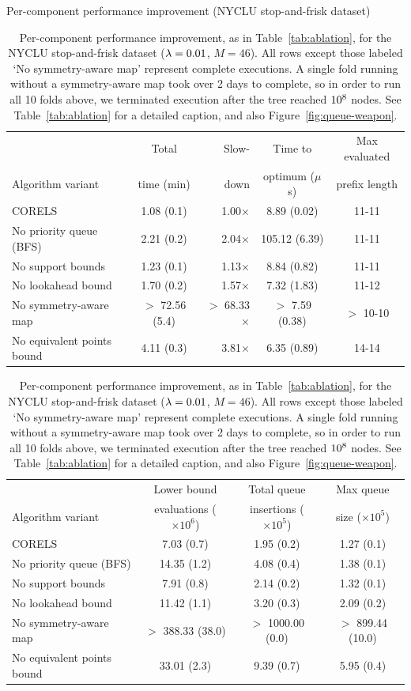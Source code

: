 \begin{table}[t!]
\centering
Per-component performance improvement (NYCLU stop-and-frisk dataset) \\
\vspace{1mm}
\begin{tabular}{l | c  r | c | c}
& Total & Slow- & Time to & Max evaluated \\
Algorithm variant & time (min) & down & optimum ($\mu$s) & prefix length \\
\hline
CORELS & 1.08 (0.1) & 1.00$\times$ & 8.89 (0.02) & 11-11 \\
No priority queue (BFS) & 2.21 (0.2) & 2.04$\times$ & 105.12 (6.39) & 11-11 \\
No support bounds & 1.23 (0.1) & 1.13$\times$ & 8.84 (0.82) & 11-11 \\
No lookahead bound & 1.70 (0.2) & 1.57$\times$ & 7.32 (1.83) & 11-12 \\
No symmetry-aware map & $>$ 72.56 (5.4) & $>$ 68.33$\times$ & $>$ 7.59 (0.38) & $>$ 10-10 \\
No equivalent points bound & 4.11 (0.3) & 3.81$\times$ & 6.35 (0.89) & 14-14 \\
\hline
\end{tabular}
\begin{tabular}{l | c | c | c}
\hline
 & Lower bound & Total queue &  Max queue \\
Algorithm variant & evaluations ($\times 10^6$) & insertions ($\times 10^5$) & size ($\times 10^5$) \\
\hline
CORELS & 7.03 (0.7) & 1.95 (0.2) & 1.27 (0.1) \\
No priority queue (BFS) & 14.35 (1.2) & 4.08 (0.4) & 1.38 (0.1) \\
No support bounds & 7.91 (0.8) & 2.14 (0.2) & 1.32 (0.1) \\
No lookahead bound & 11.42 (1.1) & 3.20 (0.3) & 2.09 (0.2) \\
No symmetry-aware map & $>$ 388.33 (38.0) & $>$ 1000.00 (0.0) & $>$ 899.44 (10.0) \\
No equivalent points bound & 33.01 (2.3) & 9.39 (0.7) & 5.95 (0.4) \\
\end{tabular}
\caption{Per-component performance improvement, as in Table~\ref{tab:ablation},
for the NYCLU stop-and-frisk dataset (${{\lambda} = 0.01}$, ${M = 46}$).
%
All rows except those labeled `No symmetry-aware map' represent complete executions.
%
A single fold running without a symmetry-aware map took over 2 days to complete, so in order to run all 10 folds above, we terminated execution after the tree reached $10 \time 10^8$ nodes.
%
See Table~\ref{tab:ablation} for a detailed caption,
and also Figure~\ref{fig:queue-weapon}.
}
\vspace{4mm}
\label{tab:ablation-weapon}
\end{table}

